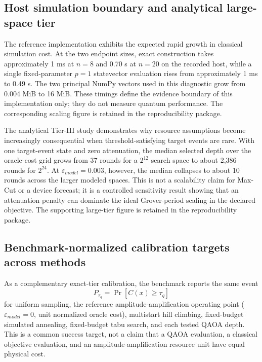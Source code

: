 \documentclass[5p,times]{elsarticle}
\begin{document}
\subsection{Host simulation boundary and analytical large-space tier}
The reference implementation exhibits the expected rapid growth in classical simulation cost. At the two endpoint sizes, exact construction takes approximately 1 ms at $n=8$ and 0.70 s at $n=20$ on the recorded host, while a single fixed-parameter $p=1$ statevector evaluation rises from approximately 1 ms to 0.49 s. The two principal NumPy vectors used in this diagnostic grow from 0.004 MiB to 16 MiB. These timings define the evidence boundary of this implementation only; they do not measure quantum performance. The corresponding scaling figure is retained in the reproducibility package.




The analytical Tier-III study demonstrates why resource assumptions become increasingly consequential when threshold-satisfying target events are rare. With one target-event state and zero attenuation, the median selected depth over the oracle-cost grid grows from 37 rounds for a $2^{12}$ search space to about 2,386 rounds for $2^{24}$. At $\varepsilon_{model}=0.003$, however, the median collapses to about 10 rounds across the larger modeled spaces. This is not a scalability claim for Max-Cut or a device forecast; it is a controlled sensitivity result showing that an attenuation penalty can dominate the ideal Grover-period scaling in the declared objective. The supporting large-tier figure is retained in the reproducibility package.




\subsection{Benchmark-normalized calibration targets across methods}
As a complementary exact-tier calibration, the benchmark reports the same event
\begin{equation}
P_{\tau_q}=\Pr[C(x)\geq\tau_q]
\end{equation}
for uniform sampling, the reference amplitude-amplification operating point ($\varepsilon_{model}=0$, unit normalized oracle cost), multistart hill climbing, fixed-budget simulated annealing, fixed-budget tabu search, and each tested QAOA depth. This is a common success target, not a claim that a QAOA evaluation, a classical objective evaluation, and an amplitude-amplification resource unit have equal physical cost.
\end{document}
